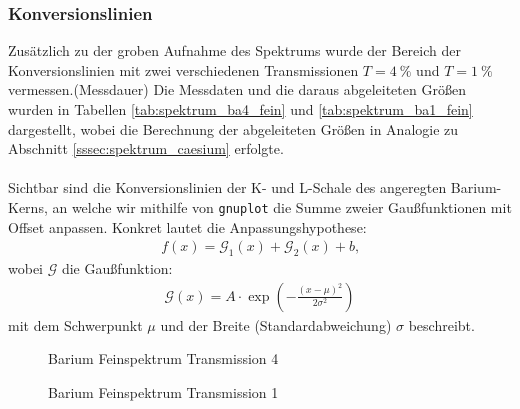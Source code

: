\documentclass[11pt, a4paper]{article}
\numberwithin{equation}{section}
\begin{document}
\subsubsection{Konversionslinien}
\label{sssec:konversionslinien}
Zusätzlich zu der groben Aufnahme des Spektrums wurde der Bereich der Konversionslinien mit zwei verschiedenen Transmissionen $T = \SI{4}{\percent}$ und $T = \SI{1}{\percent}$ vermessen.(Messdauer)
Die Messdaten und die daraus abgeleiteten Größen wurden in Tabellen \ref{tab:spektrum_ba4_fein} und \ref{tab:spektrum_ba1_fein} dargestellt, wobei die Berechnung der abgeleiteten Größen in Analogie zu Abschnitt \ref{sssec:spektrum_caesium} erfolgte.
\\
\\
Sichtbar sind die Konversionslinien der K- und L-Schale des angeregten Barium-Kerns, an welche wir mithilfe von \texttt{gnuplot} die Summe zweier Gaußfunktionen mit Offset anpassen. Konkret lautet die Anpassungshypothese:
\begin{align*}
	f(x) = \mathcal{G}_1(x) + \mathcal{G}_2(x) + b \text{,}
\end{align*}
wobei $\mathcal{G}$ die Gaußfunktion:
\begin{align*}
	\mathcal{G}(x) = A \cdot \exp\left( - \frac{(x - \mu)^2}{2 \sigma^2}\right)
\end{align*}
mit dem Schwerpunkt $\mu$ und der Breite (Standardabweichung) $\sigma$ beschreibt.
\begin{figure}[h]
	\centering
	
	\caption{Barium Feinspektrum Transmission 4}
	\label{fig:ba_t4_fein}
\end{figure}
\begin{figure}[h]
	\centering
	
	\caption{Barium Feinspektrum Transmission 1}
	\label{fig:ba_t1_fein}
\end{figure}
\end{document}
